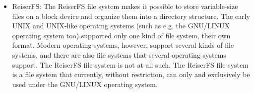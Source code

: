 \documentclass[margin=0px]{article}
\begin{document}
\begin{itemize}
\begin{itemize}
          \end{itemize}
    \item ReiserFS: The ReiserFS file system makes it possible to store variable-size files on a block device and organize them into a directory structure. The early UNIX and UNIX-like operating systems (such as e.g. the GNU/LINUX operating system too) supported only one kind of file system, their own format. Modern operating systems, however, support several kinds of file systems, and there are also file systems that several operating systems support. The ReiserFS file system is not at all such. The ReiserFS file system is a file system that currently, without restriction, can only and exclusively be used under the GNU/LINUX operating system.
\end{itemize}
\end{document}
